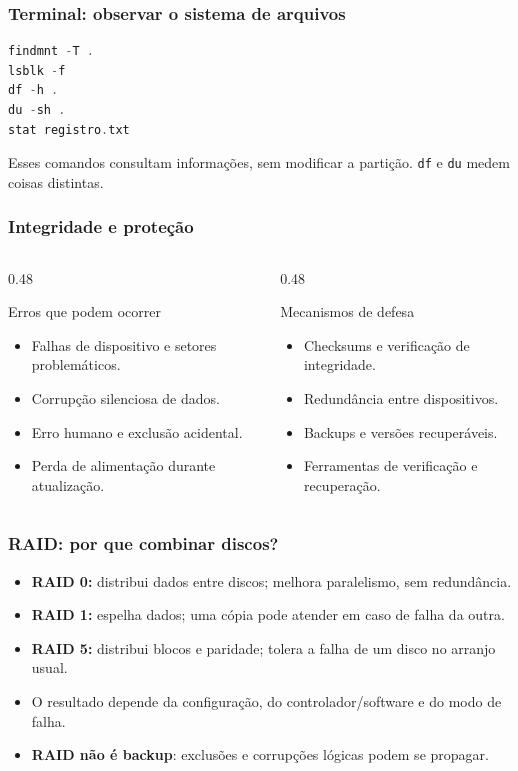 \documentclass[aspectratio=169,11pt]{beamer}
\begin{document}
\begin{frame}[fragile]
\frametitle{Terminal: observar o sistema de arquivos}
\begin{lstlisting}[language=C]
findmnt -T .
lsblk -f
df -h .
du -sh .
stat registro.txt
\end{lstlisting}
\vfill\small\textcolor{dkblue}{Esses comandos consultam informações, sem modificar a partição. \texttt{df} e \texttt{du} medem coisas distintas.}

\end{frame}

\begin{frame}
\frametitle{Integridade e proteção}
\begin{columns}[T,onlytextwidth]
\begin{column}{0.48\textwidth}
\begin{block}{Erros que podem ocorrer}\small\begin{itemize}
\item Falhas de dispositivo e setores problemáticos.
\item Corrupção silenciosa de dados.
\item Erro humano e exclusão acidental.
\item Perda de alimentação durante atualização.
\end{itemize}\end{block}\end{column}
\begin{column}{0.48\textwidth}
\begin{block}{Mecanismos de defesa}\small\begin{itemize}
\item Checksums e verificação de integridade.
\item Redundância entre dispositivos.
\item Backups e versões recuperáveis.
\item Ferramentas de verificação e recuperação.
\end{itemize}\end{block}\end{column}\end{columns}

\end{frame}

\begin{frame}
\frametitle{RAID: por que combinar discos?}
\large
\begin{itemize}
\item \textbf{RAID 0:} distribui dados entre discos; melhora paralelismo, sem redundância.
\item \textbf{RAID 1:} espelha dados; uma cópia pode atender em caso de falha da outra.
\item \textbf{RAID 5:} distribui blocos e paridade; tolera a falha de um disco no arranjo usual.
\item O resultado depende da configuração, do controlador/software e do modo de falha.
\item \textbf{RAID não é backup}: exclusões e corrupções lógicas podem se propagar.
\end{itemize}

\end{frame}
\end{document}
